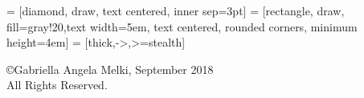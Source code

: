 \documentclass[reqno]{vcuthesis}
\numberwithin{equation}{chapter}
\begin{document}


\makeatletter
\newcommand\pagenumberingnoreset[1]{\gdef\thepage{\csname @#1\endcsname\c@page}}
\makeatother

 = [diamond, draw, text centered, inner sep=3pt]
 = [rectangle, draw, fill=gray!20,text width=5em, text centered, rounded corners, minimum height=4em]
 = [thick,->,>=stealth]

\newcommand{\thesisordissertation}{Dissertation}
\newcommand{\thesistitle}{\uppercase\expandafter{} Novel Support Vector Machines for Diverse Learning Paradigms}
\newcommand{\authorsname}{Gabriella Angela Melki}
\newcommand{\thesismonth}{September}
\newcommand{\graduatingyear}{2018}
\newcommand{\degree}{Doctor of Philosophy}
\newcommand{\pastdegreeone}{Ph.D. Candidate}
\newcommand{\pastdegreetwo}{MSc. Computer Science, Virginia Commonwealth University, 2016} %
\newcommand{\committeechair}{Alberto Cano}
\newcommand{\committeechairtwo}{Sebasti\'{a}n Ventura}
\newcommand{\major}{Computer Science}
\newcommand{\school}{Virginia Commonwealth University}
\newcommand{\chairposition}{Assistant Professor}
\newcommand{\chairpositiontwo}{Professor}
\newcommand{\majortwo}{Computer Science \& Numerical Analysis}
\newcommand{\schooltwo}{University of C\'{o}rdoba}

\vspace*{10em}
\begin{center}
\thispagestyle{empty}
\copyright Gabriella Angela Melki, September {\graduatingyear}\\
All Rights Reserved.
\end{center}
\vspace*{\fill}
\maketitlepage

\setlength{\headheight}{12pt}

\end{document}
